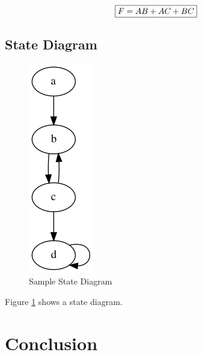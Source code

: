 \documentclass[10pt]{IEEEtran} %
\begin{document}
\[\framebox{\(F = AB + AC + BC\)}\]

\subsection{State Diagram}

\begin{figure}[h]
  \centering
  \includegraphics[scale=0.5]{my-diagram.png}
  \caption{Sample State Diagram}
  \label{fig:state-diagram}
\end{figure}

Figure \ref{fig:state-diagram} shows a state diagram.

\section{Conclusion}
\kant[42][1-2]
\end{document}

